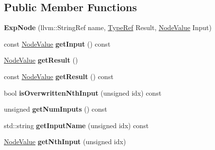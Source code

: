 \subsection*{Public Member Functions}
\begin{DoxyCompactItemize}
\item 
\mbox{\label{classglow_1_1_exp_node_ab1ada9512cd157788c37eb3eb1f085d1}} 
{\bfseries Exp\+Node} (llvm\+::\+String\+Ref name, \hyperlink{structglow_1_1_type}{Type\+Ref} Result, \hyperlink{structglow_1_1_node_value}{Node\+Value} Input)
\item 
\mbox{\label{classglow_1_1_exp_node_afbc720fde875f29267cf138f8b918688}} 
const \hyperlink{structglow_1_1_node_value}{Node\+Value} {\bfseries get\+Input} () const
\item 
\mbox{\label{classglow_1_1_exp_node_a48a19e2153f8779f456bdd8984d69531}} 
\hyperlink{structglow_1_1_node_value}{Node\+Value} {\bfseries get\+Result} ()
\item 
\mbox{\label{classglow_1_1_exp_node_a638c82d7f5978cf175b241bc2e543ed2}} 
const \hyperlink{structglow_1_1_node_value}{Node\+Value} {\bfseries get\+Result} () const
\item 
\mbox{\label{classglow_1_1_exp_node_a0642f7dec71d9c68218cc713e4ab6477}} 
bool {\bfseries is\+Overwritten\+Nth\+Input} (unsigned idx) const
\item 
\mbox{\label{classglow_1_1_exp_node_ab18034aa8c574a099041781ebce0d8ec}} 
unsigned {\bfseries get\+Num\+Inputs} () const
\item 
\mbox{\label{classglow_1_1_exp_node_a738869a9ea1b953bc75cbeceac56c010}} 
std\+::string {\bfseries get\+Input\+Name} (unsigned idx) const
\item 
\mbox{\label{classglow_1_1_exp_node_a6654907a1c205e6499782dc42634e184}} 
\hyperlink{structglow_1_1_node_value}{Node\+Value} {\bfseries get\+Nth\+Input} (unsigned idx)
\item 
\mbox{\label{classglow_1_1_exp_node_acce70f577ca2b0af5b068f5bc3b47f6f}} 

\end{DoxyCompactItemize}
